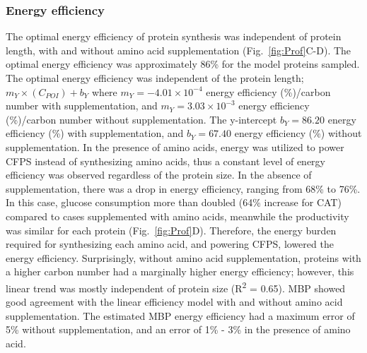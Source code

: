 \documentclass[journal=asbcd6,manuscript=article]{achemso}
\begin{document}


\subsubsection{Energy efficiency}
The optimal energy efficiency of protein synthesis was independent of protein length, with and without amino acid supplementation (Fig.~\ref{fig:Prof}C-D).
The optimal energy efficiency was approximately 86\% for the model proteins sampled.
The optimal energy efficiency was independent of the protein length; $m_{Y}\times(C_{POI})+b_{Y}$ where $m_{Y} =  -4.01\times10^{-4}$ energy efficiency (\%)/carbon number with supplementation,
and $m_{Y} = 3.03\times10^{-3}$ energy efficiency (\%)/carbon number without supplementation.
The y-intercept $b_{Y} = 86.20$ energy efficiency (\%) with supplementation, and $b_{Y} = 67.40$ energy efficiency (\%) without supplementation.
In the presence of amino acids, energy was utilized to power CFPS instead of synthesizing amino acids, thus a constant level of energy efficiency was observed regardless of the protein size.
In the absence of supplementation, there was a drop in energy efficiency, ranging from 68\% to 76\%.
In this case, glucose consumption more than doubled (64\% increase for CAT) compared to cases supplemented with amino acids, meanwhile the productivity was similar for each protein (Fig.~\ref{fig:Prof}D).
Therefore, the energy burden required for synthesizing each amino acid, and powering CFPS, lowered the energy efficiency.
Surprisingly, without amino acid supplementation, proteins with a higher carbon number had a marginally higher energy efficiency;
however, this linear trend was mostly independent of protein size (R\textsuperscript{2} = 0.65).
MBP showed good agreement with the linear efficiency model with and without amino acid supplementation.
The estimated MBP energy efficiency had a maximum error of 5\% without supplementation, and an error of 1\% - 3\% in the presence of amino acid.
\end{document}
